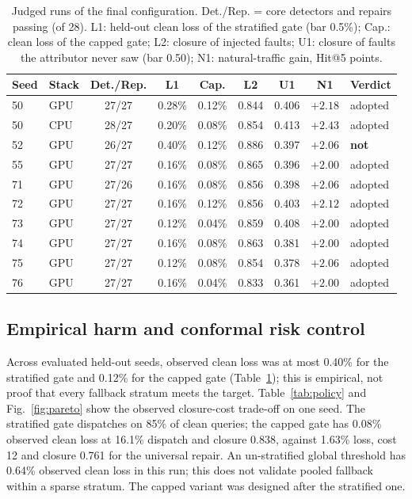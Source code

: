 \documentclass[conference]{IEEEtran}
\begin{document}
\begin{table}[t]
\caption{Judged runs of the final configuration. Det./Rep. = core detectors and repairs passing (of 28). L1: held-out clean loss of the stratified gate (bar 0.5\%); Cap.: clean loss of the capped gate; L2: closure of injected faults; U1: closure of faults the attributor never saw (bar 0.50); N1: natural-traffic gain, Hit@5 points.}
\label{tab:runs}
\centering\footnotesize
\begin{tabular}{@{}llccccccl@{}}
\toprule
Seed & Stack & Det./Rep. & L1 & Cap. & L2 & U1 & N1 & Verdict\\
\midrule
50 & GPU & 27/27 & 0.28\% & 0.12\% & 0.844 & 0.406 & $+2.18$ & adopted\\
50 & CPU & 28/27 & 0.20\% & 0.08\% & 0.854 & 0.413 & $+2.43$ & adopted\\
52 & GPU & 26/27 & 0.40\% & 0.12\% & 0.886 & 0.397 & $+2.06$ & \textbf{not}\\
55 & GPU & 27/27 & 0.16\% & 0.08\% & 0.865 & 0.396 & $+2.00$ & adopted\\
71 & GPU & 27/26 & 0.16\% & 0.08\% & 0.856 & 0.398 & $+2.06$ & adopted\\
72 & GPU & 27/27 & 0.16\% & 0.12\% & 0.856 & 0.403 & $+2.12$ & adopted\\
73 & GPU & 27/27 & 0.12\% & 0.04\% & 0.859 & 0.408 & $+2.00$ & adopted\\
74 & GPU & 27/27 & 0.16\% & 0.08\% & 0.863 & 0.381 & $+2.00$ & adopted\\
75 & GPU & 27/27 & 0.12\% & 0.08\% & 0.854 & 0.378 & $+2.06$ & adopted\\
76 & GPU & 27/27 & 0.16\% & 0.04\% & 0.833 & 0.361 & $+2.00$ & adopted\\
\bottomrule
\end{tabular}
\end{table}

\subsection{Empirical harm and conformal risk control}\label{sec:res-gate}
Across evaluated held-out seeds, observed clean loss was at most 0.40\% for the stratified gate and 0.12\% for the capped gate (Table~\ref{tab:runs}); this is empirical, not proof that every fallback stratum meets the target. Table~\ref{tab:policy} and Fig.~\ref{fig:pareto} show the observed closure-cost trade-off on one seed. The stratified gate dispatches on 85\% of clean queries; the capped gate has 0.08\% observed clean loss at 16.1\% dispatch and closure 0.838, against 1.63\% loss, cost 12 and closure 0.761 for the universal repair. An un-stratified global threshold has 0.64\% observed clean loss in this run; this does not validate pooled fallback within a sparse stratum. The capped variant was designed after the stratified one.
\end{document}
